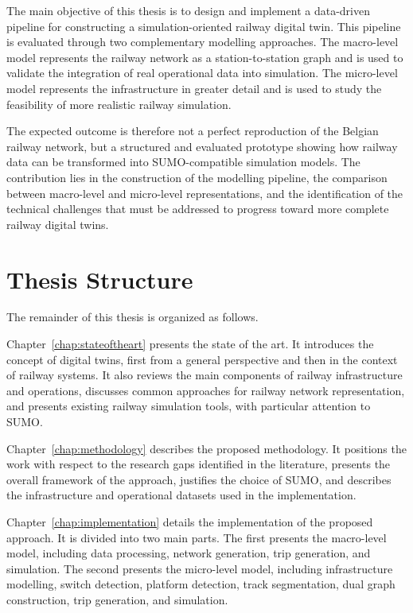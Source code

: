 The main objective of this thesis is to design and implement a data-driven pipeline for constructing a simulation-oriented 
railway digital twin. This pipeline is evaluated through two complementary modelling approaches. The macro-level model 
represents the railway network as a station-to-station graph and is used to validate the integration of real operational 
data into simulation. The micro-level model represents the infrastructure in greater detail and is used to study the 
feasibility of more realistic railway simulation.

The expected outcome is therefore not a perfect reproduction of the Belgian railway network, but a structured and evaluated 
prototype showing how railway data can be transformed into SUMO-compatible simulation models. The contribution lies in the 
construction of the modelling pipeline, the comparison between macro-level and micro-level representations, and the 
identification of the technical challenges that must be addressed to progress toward more complete railway digital twins.

\newpage

\section{Thesis Structure}
The remainder of this thesis is organized as follows.

Chapter~\ref{chap:stateoftheart} presents the state of the art. It introduces the concept of digital twins, first from a 
general perspective and then in the context of railway systems. It also reviews the main components of railway 
infrastructure and operations, discusses common approaches for railway network representation, and presents existing 
railway simulation tools, with particular attention to SUMO.\@

Chapter~\ref{chap:methodology} describes the proposed methodology. It positions the work with respect to the research gaps 
identified in the literature, presents the overall framework of the approach, justifies the choice of SUMO, and describes 
the infrastructure and operational datasets used in the implementation.

Chapter~\ref{chap:implementation} details the implementation of the proposed approach. It is divided into two main parts. 
The first presents the macro-level model, including data processing, network generation, trip generation, and simulation. 
The second presents the micro-level model, including infrastructure modelling, switch detection, platform detection, track 
segmentation, dual graph construction, trip generation, and simulation.

